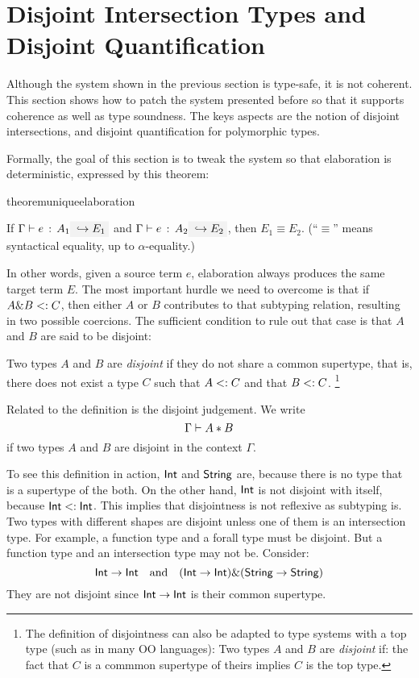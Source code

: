\section{Disjoint Intersection Types and Disjoint Quantification}
\label{sec:disjoint}

Although the system shown in the previous section is type-safe, it is not
coherent. This section shows how to patch the system presented before so that it
supports coherence as well as type soundness. The keys aspects are the notion of
disjoint intersections, and disjoint quantification for polymorphic types.

Formally, the goal of this section is to tweak the system so that elaboration is deterministic, expressed by this theorem:
\begin{restatable}{theorem}{uniqueelaboration}
  \label{theorem:unique-elaboration}

  If $\jtype \Gamma e {A_1} \yields {E_1}$ and $\jtype \Gamma e {A_2} \yields
  {E_2}$, then $E_1 \equiv E_2$. (``$\equiv$'' means syntactical equality, up to
  $\alpha$-equality.)

\end{restatable}

\noindent In other words, given a source term $e$, elaboration always produces
the same target term $E$. The most important hurdle we need to overcome is that
if $A \& B <: C$, then either $A$ or $B$ contributes to that subtyping
relation, resulting in two possible coercions. The sufficient condition to rule
out that case is that $A$ and $B$ are said to be disjoint:

\begin{definition}
  Two types $A$ and $B$ are \emph{disjoint} if they do not share a common
  supertype, that is, there does not exist a type $C$ such that $A <: C$
  and that $B <: C$. \footnote{
  The definition of disjointness can also be adapted to type systems with a top
  type (such as \lstinline@Object@ in many OO languages): Two types $A$ and $B$
  are \emph{disjoint} if: the fact that $C$ is a commmon supertype of theirs
  implies $C$ is the top type.
  }
\end{definition}

Related to the definition is the disjoint judgement. We write
\[ \Gamma \vdash A * B \]
if two types $A$ and $B$ are disjoint in the context $\Gamma$.

To see this definition in action, $\textsf{Int}$ and $\textsf{String}$ are, because there is
no type that is a supertype of the both. On the other hand, $\textsf{Int}$ is not
disjoint with itself, because $\textsf{Int} <: \textsf{Int}$. This implies that
disjointness is not reflexive as subtyping is. Two types with different shapes
are disjoint unless one of them is an intersection type. For example, a function
type and a forall type must be disjoint. But a function type and an intersection
type may not be. Consider:
\[ \textsf{Int} \to \textsf{Int} \quad \text{and} \quad (\textsf{Int} \to \textsf{Int}) \& (\textsf{String} \to \textsf{String}) \]
They are not disjoint since $\textsf{Int} \to \textsf{Int}$ is their common supertype.

